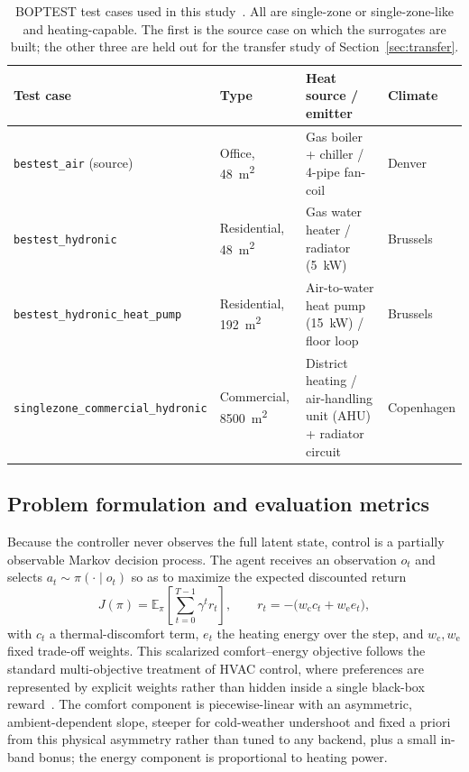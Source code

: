 \documentclass[5p]{elsarticle}
\begin{document}
\begin{table}[t]
\centering
\small
\begin{tabular}{@{}llll@{}}
\toprule
Test case & Type & Heat source / emitter & Climate \\
\midrule
\texttt{bestest\_air} (source) & Office, \SI{48}{\meter\squared} & Gas boiler + chiller / 4-pipe fan-coil & Denver \\
\texttt{bestest\_hydronic} & Residential, \SI{48}{\meter\squared} & Gas water heater / radiator (\SI{5}{\kilo\watt}) & Brussels \\
\texttt{bestest\_hydronic\_heat\_pump} & Residential, \SI{192}{\meter\squared} & Air-to-water heat pump (\SI{15}{\kilo\watt}) / floor loop & Brussels \\
\texttt{singlezone\_commercial\_hydronic} & Commercial, \SI{8500}{\meter\squared} & District heating / air-handling unit (AHU) + radiator circuit & Copenhagen \\
\bottomrule
\end{tabular}
\caption{BOPTEST test cases used in this study~\cite{Blum2021BOPTEST}. All are single-zone or
single-zone-like and heating-capable. The first is the source case on which the surrogates are
built; the other three are held out for the transfer study of Section~\ref{sec:transfer}.}
\label{tab:testcases}
\end{table}

\subsection{Problem formulation and evaluation metrics}\label{ssec:pomdp}
Because the controller never observes the full latent state, control is a partially observable
Markov decision process. The agent receives an observation $o_t$ and selects
$a_t\sim\pi(\cdot\mid o_t)$ so as to maximize the expected discounted return~\cite{Sutton2018RL}
\begin{equation}
J(\pi)=\mathbb{E}_{\pi}\!\left[\sum_{t=0}^{T-1}\gamma^{t} r_t\right],
\qquad r_t=-\big(w_{\mathrm{c}} c_t + w_{\mathrm{e}} e_t\big),
\label{eq:return}
\end{equation}
with $c_t$ a thermal-discomfort term, $e_t$ the heating energy over the step, and
$w_{\mathrm{c}},w_{\mathrm{e}}$ fixed trade-off weights. This scalarized comfort--energy objective
follows the standard multi-objective treatment of HVAC control, where preferences are represented by
explicit weights rather than hidden inside a single black-box
reward~\cite{Roijers2013MOSurvey,Yang2019MORL,Hayes2022MOSurvey}. The comfort component is
piecewise-linear with an asymmetric, ambient-dependent slope, steeper for cold-weather undershoot
and fixed a priori from this physical asymmetry rather than tuned to any backend, plus a small
in-band bonus; the energy component is proportional to heating power.
\end{document}
